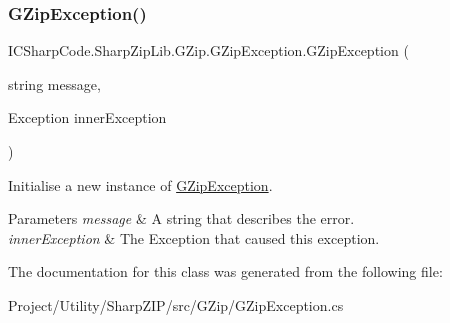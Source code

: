 \subsubsection{\texorpdfstring{G\+Zip\+Exception()}{GZipException()}\hspace{0.1cm}{\footnotesize\ttfamily [4/4]}}
{\footnotesize\ttfamily I\+C\+Sharp\+Code.\+Sharp\+Zip\+Lib.\+G\+Zip.\+G\+Zip\+Exception.\+G\+Zip\+Exception (\begin{DoxyParamCaption}\item[{string}]{message,  }\item[{Exception}]{inner\+Exception }\end{DoxyParamCaption})\hspace{0.3cm}{\ttfamily [inline]}}



Initialise a new instance of \hyperlink{class_i_c_sharp_code_1_1_sharp_zip_lib_1_1_g_zip_1_1_g_zip_exception}{G\+Zip\+Exception}. 


\begin{DoxyParams}{Parameters}
{\em message} & A string that describes the error.\\
\hline
{\em inner\+Exception} & The Exception that caused this exception.\\
\hline
\end{DoxyParams}


The documentation for this class was generated from the following file\+:\begin{DoxyCompactItemize}
\item 
Project/\+Utility/\+Sharp\+Z\+I\+P/src/\+G\+Zip/G\+Zip\+Exception.\+cs\end{DoxyCompactItemize}
